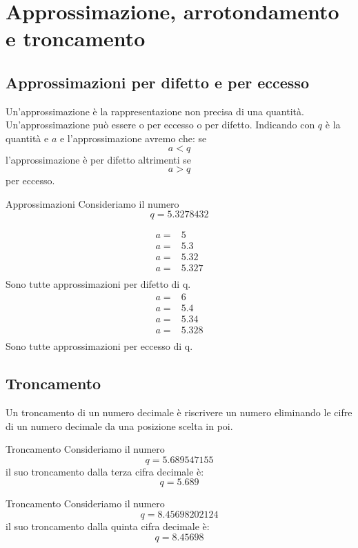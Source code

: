 \chapter{Approssimazione, arrotondamento e troncamento}
\label{cha:Approssimazione}
\section{Approssimazioni per difetto e per eccesso}
Un'approssimazione è la rappresentazione non precisa di una quantità. Un'approssimazione  può essere o per eccesso o per difetto. Indicando con  $q$ è la quantità e $a$ e l'approssimazione avremo che:
se\[a<q\] l'approssimazione è per difetto altrimenti se \[a>q\] per eccesso.
  \begin{esempiot}{Approssimazioni}{}
	Consideriamo il numero\[q=\num{5,3278432}\]
\end{esempiot}
\begin{align*}
	a=&\num{5}\\
	a=&\num{5,3}\\
	a=&\num{5,32}\\
	a=&\num{5,327}\\
\end{align*}
Sono tutte approssimazioni per difetto di q.
\begin{align*}
	a=&\num{6}\\
	a=&\num{5,4}\\
	a=&\num{5,34}\\
	a=&\num{5,328}\\
\end{align*}
Sono tutte approssimazioni per eccesso di q.
\section{Troncamento}
Un troncamento di un numero decimale è riscrivere un numero eliminando le cifre di un numero decimale da una posizione scelta in poi. 
  \begin{esempiot}{Troncamento}{}
	Consideriamo il numero\[q=\num{5.689547155}\]
	il suo troncamento dalla terza cifra decimale è:
	\[q=\num{5.689}\]
\end{esempiot}
  \begin{esempiot}{Troncamento}{}
	Consideriamo il numero\[q=\num{8.45698202124}\]
	il suo troncamento dalla quinta cifra decimale è:
	\[q=\num{8.45698}\]
\end{esempiot}
